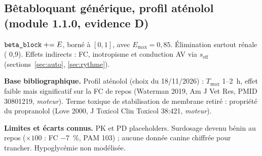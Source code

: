 \documentclass[10pt,a4paper]{article}
\newcommand{\vp}[1]{\text{\texttt{\detokenize{#1}}}}
\newcommand{\acc}[1]{\textsl{#1}}
\newcommand{\limite}[1]{\par\textbf{Limites et écarts connus.} #1}
\newcommand{\sources}[1]{\par\textbf{Base bibliographique.} #1}
\begin{document}
\subsection{Bêtabloquant générique, profil aténolol (module 1.1.0, evidence D)}
$\vp{beta_block} \mathrel{+}= E$, borné à $[0, 1]$, avec $E_\text{max} = 0{,}85$. Élimination surtout rénale (\vp{renal_exp} 0,9). Effets indirects : FC, inotropisme et conduction AV via $s_\text{eff}$ (sections~\ref{sec:auto}, \ref{sec:rythme}).
\sources{Profil aténolol (choix du 18/11/2026) : $T_\text{max}$ 1--2~h, effet faible mais significatif sur la FC de repos (Waterman 2019, Am J Vet Res, PMID 30801219, \acc{moteur}). Terme toxique de stabilisation de membrane retiré : propriété du propranolol (Love 2000, J Toxicol Clin Toxicol 38:421, \acc{moteur}).}
\limite{PK et PD placeholders. Surdosage devenu bénin au repos ($\times 100$ : FC $-7$~\%, PAM 103) ; aucune donnée canine chiffrée pour trancher. Hypoglycémie non modélisée.}
\end{document}
